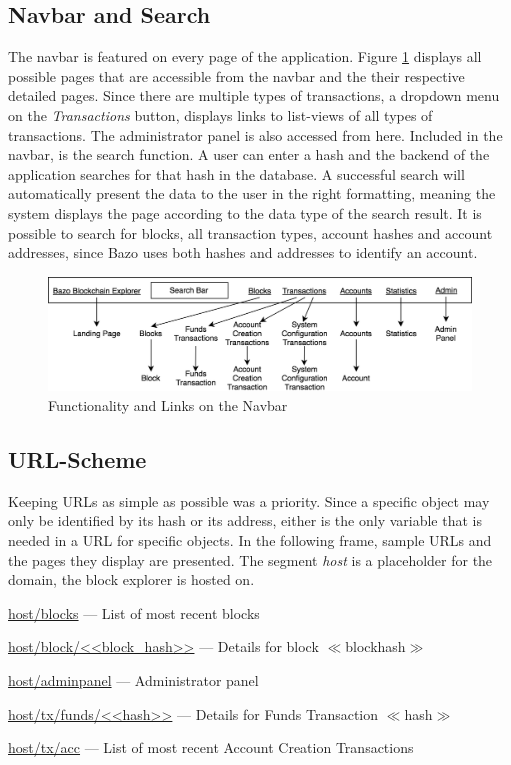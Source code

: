 \subsection{Navbar and Search}
The navbar is featured on every page of the application. Figure \ref{fig:navbar} displays all possible pages that are accessible from the navbar and the their respective detailed pages. Since there are multiple types of transactions, a dropdown menu on the \emph{Transactions} button, displays links to list-views of all types of transactions. The administrator panel is also accessed from here. Included in the navbar, is the search function. A user can enter a hash and the backend of the application searches for that hash in the database. A successful search will automatically present the data to the user in the right formatting, meaning the system displays the page according to the data type of the search result. It is possible to search for blocks, all transaction types, account hashes and account addresses, since Bazo uses both hashes and addresses to identify an account.

\begin{figure}[h]
  \includegraphics[scale=0.35]{navbarmockup.png}
  \centering
  \caption{Functionality and Links on the Navbar}
  \label{fig:navbar}
\end{figure}

\subsection{URL-Scheme}
Keeping URLs as simple as possible was a priority. Since a specific object may only be identified by its hash or its address, either is the only variable that is needed in a URL for specific objects. In the following frame, sample URLs and the pages they display are presented. The segment \emph{host} is a placeholder for the domain, the block explorer is hosted on.

\begin{framed}
\url{host/blocks} --- List of most recent blocks

\url{host/block/<<block_hash>>} --- Details for block $\ll$blockhash$\gg$

\url{host/adminpanel} --- Administrator panel

\url{host/tx/funds/<<hash>>} --- Details for Funds Transaction $\ll$hash$\gg$

\url{host/tx/acc} --- List of most recent Account Creation Transactions
\end{framed}

